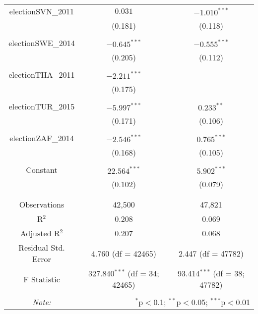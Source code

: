 \documentclass[12pt, titlepage]{article}
\begin{document}
\begin{table}[!htbp]
\begin{tabular}{@{\extracolsep{5pt}}ccc }
		electionSVN\_2011 & $0.031$ & $-1.010^{***}$ \\ 
		& (0.181) & (0.118) \\ 
		& & \\ 
		electionSWE\_2014 & $-0.645^{***}$ & $-0.555^{***}$ \\ 
		& (0.205) & (0.112) \\ 
		& & \\ 
		electionTHA\_2011 & $-2.211^{***}$ &  \\ 
		& (0.175) &  \\ 
		& & \\ 
		electionTUR\_2015 &$ -5.997^{***}$ & $0.233^{**}$ \\ 
		& (0.171) & (0.106) \\ 
		& & \\ 
		electionZAF\_2014 & $-2.546^{***}$ & $0.765^{***}$ \\ 
		& (0.168) & (0.105) \\ 
		& & \\ 
		Constant & $22.564^{***}$ & $5.902^{***}$ \\ 
		& (0.102) & (0.079) \\ 
		& & \\ 
		\hline \\[-1.8ex] 
		Observations & \multicolumn{1}{c}{42,500} & \multicolumn{1}{c}{47,821} \\ 
		R$^{2}$ & \multicolumn{1}{c}{0.208} & \multicolumn{1}{c}{0.069} \\ 
		Adjusted R$^{2}$ & \multicolumn{1}{c}{0.207} & \multicolumn{1}{c}{0.068} \\ 
		Residual Std. Error & \multicolumn{1}{c}{4.760 (df = 42465)} & \multicolumn{1}{c}{2.447 (df = 47782)} \\ 
		F Statistic & \multicolumn{1}{c}{327.840$^{***}$ (df = 34; 42465)} & \multicolumn{1}{c}{93.414$^{***}$ (df = 38; 47782)} \\ 
		\hline 
		\hline \\[-1.8ex] 
		\textit{Note:}  & \multicolumn{2}{r}{$^{*}$p$<$0.1; $^{**}$p$<$0.05; $^{***}$p$<$0.01} \\ 
	\end{tabular} 
\end{table} 
\end{document}
